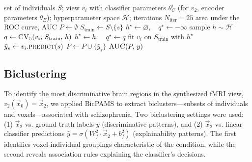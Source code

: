 \documentclass{article}
\begin{document}
\begin{algorithm}[t]
\caption{Nested leave-one-individual-out validation for view $v_i$}
\label{alg:nested-loocv}
\begin{algorithmic}[1]
\Require set of individuals $S$; view $v_i$ with classifier parameters $\theta^i_C$
         (for $v_2$, encoder parameters $\theta_E$); hyperparameter space $\mathcal{H}$;
         iterations $N_{\text{iter}} = 25$
\Ensure area under the ROC curve, $\mathrm{AUC}$
\State $P \gets \emptyset$ 
 
    \State $S_{\text{train}} \gets S \setminus \{s\}$
    \State $h^\star \gets \varnothing,\quad q^\star \gets -\infty$
     
        \State sample $h \sim \mathcal{H}$
        \State $q \gets \textsc{CV}_5(v_i,\, S_{\text{train}},\, h)$
            \State $h^\star \gets h,\quad q^\star \gets q$
        \EndIf
    \EndFor
    \State fit $v_i$ on $S_{\text{train}}$ with $h^\star$
    \State $\hat{y}_s \gets v_i.\textsc{predict}(s)$
    \State $P \gets P \cup \{\hat{y}_s\}$
\EndFor
\State \Return $\textsc{AUC}(P,\, y)$
\end{algorithmic}
\end{algorithm}

\subsection{Biclustering}\label{setting:biclustering}

To identify the most discriminative brain regions in the synthesized fMRI view, $v_2(\vec{x}_0) = \vec{x}_2$, we applied BicPAMS \cite{henriques2017bicpams} to extract biclusters—subsets of individuals and voxels—associated with schizophrenia. Two biclustering settings were used: (1) $\vec{x}_2$ vs. ground truth labels $y$ (discriminative patterns), and (2) $\vec{x}_2$ vs. linear classifier predictions $\hat{y} = \sigma(W_f^2 \cdot \vec{x}_2 + b_f^2)$ (explainability patterns). The first identifies voxel-individual groupings characteristic of the condition, while the second reveals association rules explaining the classifier’s decisions.
\end{document}
